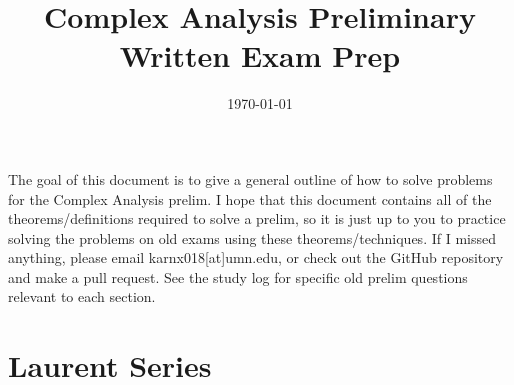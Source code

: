 \documentclass[10pt]{article}
\title{Complex Analysis Preliminary Written Exam Prep}
\begin{document}
\date{\today}
\maketitle
The goal of this document is to give a general outline of how to solve problems for the Complex Analysis prelim. I hope that this document contains all of the 
theorems/definitions required to solve a prelim, so it is just up to you to practice solving the problems on old exams using these theorems/techniques.
If I missed anything, please email karnx018[at]umn.edu, or check out the GitHub repository and make a pull request. See the study log for specific old 
prelim questions relevant to each section.

\section{Laurent Series}
\end{document}

